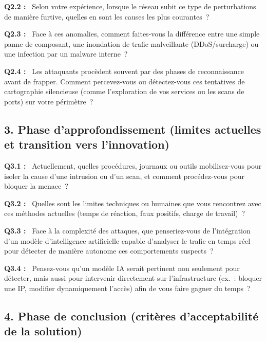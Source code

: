 \documentclass[12pt,a4paper]{article}
\newcommand{\og}{\guillemotleft\,}
\newcommand{\fg}{\,\guillemotright}
\begin{document}
\bigskip

\textbf{Q2.2 :} \og{} Selon votre exp\'{e}rience, lorsque le r\'{e}seau subit ce type de perturbations de
mani\`{e}re furtive, quelles en sont les causes les plus courantes~? \fg{}

\bigskip

\textbf{Q2.3 :} \og{} Face \`{a} ces anomalies, comment faites-vous la diff\'{e}rence entre une simple panne
de composant, une inondation de trafic malveillante (DDoS/surcharge) ou une infection par
un malware interne~? \fg{}

\bigskip

\textbf{Q2.4 :} \og{} Les attaquants proc\`{e}dent souvent par des phases de reconnaissance avant de
frapper. Comment percevez-vous ou d\'{e}tectez-vous ces tentatives de cartographie silencieuse
(comme l'exploration de vos services ou les scans de ports) sur votre p\'{e}rim\`{e}tre~? \fg{}

\subsection*{3. Phase d'approfondissement (limites actuelles et transition vers l'innovation)}

\textbf{Q3.1 :} \og{} Actuellement, quelles proc\'{e}dures, journaux ou outils mobilisez-vous pour
isoler la cause d'une intrusion ou d'un scan, et comment proc\'{e}dez-vous pour bloquer la
menace~? \fg{}

\bigskip

\textbf{Q3.2 :} \og{} Quelles sont les limites techniques ou humaines que vous rencontrez avec ces
m\'{e}thodes actuelles (temps de r\'{e}action, faux positifs, charge de travail)~? \fg{}

\bigskip

\textbf{Q3.3 :} \og{} Face \`{a} la complexit\'{e} des attaques, que penseriez-vous de l'int\'{e}gration d'un
mod\`{e}le d'intelligence artificielle capable d'analyser le trafic en temps r\'{e}el pour d\'{e}tecter de
mani\`{e}re autonome ces comportements suspects~? \fg{}

\bigskip

\textbf{Q3.4 :} \og{} Pensez-vous qu'un mod\`{e}le IA serait pertinent non seulement pour d\'{e}tecter,
mais aussi pour intervenir directement sur l'infrastructure (ex.~: bloquer une IP, modifier
dynamiquement l'acc\`{e}s) afin de vous faire gagner du temps~? \fg{}

\subsection*{4. Phase de conclusion (crit\`{e}res d'acceptabilit\'{e} de la solution)}
\end{document}
